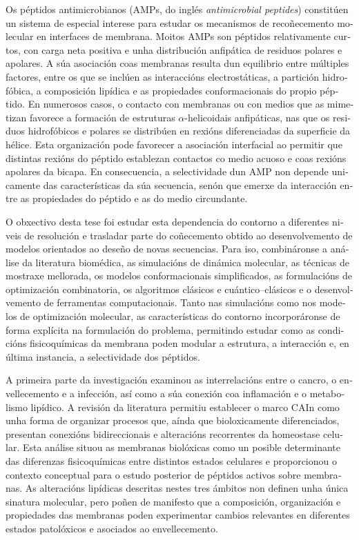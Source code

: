 \begin{otherlanguage}{galician}
Os péptidos antimicrobianos (AMPs, do inglés \textit{antimicrobial peptides}) constitúen un sistema de especial interese para estudar os mecanismos de recoñecemento molecular en interfaces de membrana. Moitos AMPs son péptidos relativamente curtos, con carga neta positiva e unha distribución anfipática de residuos polares e apolares. A súa asociación coas membranas resulta dun equilibrio entre múltiples factores, entre os que se inclúen as interaccións electrostáticas, a partición hidrofóbica, a composición lipídica e as propiedades conformacionais do propio péptido. En numerosos casos, o contacto con membranas ou con medios que as mimetizan favorece a formación de estruturas $\alpha$-helicoidais anfipáticas, nas que os residuos hidrofóbicos e polares se distribúen en rexións diferenciadas da superficie da hélice. Esta organización pode favorecer a asociación interfacial ao permitir que distintas rexións do péptido establezan contactos co medio acuoso e coas rexións apolares da bicapa. En consecuencia, a selectividade dun AMP non depende unicamente das características da súa secuencia, senón que emerxe da interacción entre as propiedades do péptido e as do medio circundante.

O obxectivo desta tese foi estudar esta dependencia do contorno a diferentes niveis de resolución e trasladar parte do coñecemento obtido ao desenvolvemento de modelos orientados ao deseño de novas secuencias. Para iso, combináronse a análise da literatura biomédica, as simulacións de dinámica molecular, as técnicas de mostraxe mellorada, os modelos conformacionais simplificados, as formulacións de optimización combinatoria, os algoritmos clásicos e cuántico–clásicos e o desenvolvemento de ferramentas computacionais. Tanto nas simulacións como nos modelos de optimización molecular, as características do contorno incorporáronse de forma explícita na formulación do problema, permitindo estudar como as condicións fisicoquímicas da membrana poden modular a estrutura, a interacción e, en última instancia, a selectividade dos péptidos.

A primeira parte da investigación examinou as interrelacións entre o cancro, o envellecemento e a infección, así como a súa conexión coa inflamación e o metabolismo lipídico. A revisión da literatura permitiu establecer o marco CAIn como unha forma de organizar procesos que, aínda que bioloxicamente diferenciados, presentan conexións bidireccionais e alteracións recorrentes da homeostase celular. Esta análise situou as membranas biolóxicas como un posible determinante das diferenzas fisicoquímicas entre distintos estados celulares e proporcionou o contexto conceptual para o estudo posterior de péptidos activos sobre membranas. As alteracións lipídicas descritas nestes tres ámbitos non definen unha única sinatura molecular, pero poñen de manifesto que a composición, organización e propiedades das membranas poden experimentar cambios relevantes en diferentes estados patolóxicos e asociados ao envellecemento.


\end{otherlanguage}
